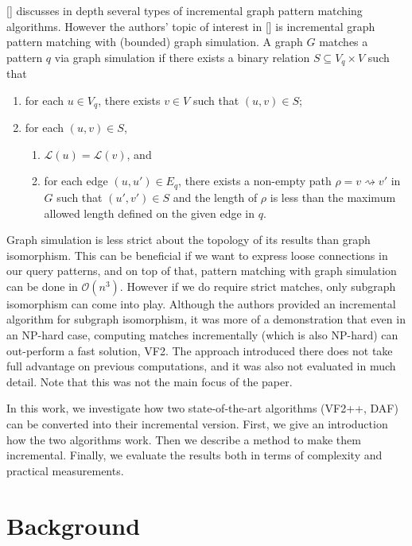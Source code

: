 [] 
discusses in depth several types of incremental graph pattern matching algorithms.
However the authors' topic of interest in [] is incremental graph pattern matching
with (bounded) graph simulation. A graph \(G\) matches a pattern \(q\) via graph 
simulation if there exists a binary relation \(S \subseteq V_q \times V\) such that 
\begin{enumerate}
    \item for each \(u \in V_q\), there exists \(v \in V\) such that \((u, v) \in S\);
    \item for each \((u, v) \in S\), 
        \begin{enumerate}
            \item \(\mathcal{L}(u) = \mathcal{L}(v)\), and
            \item for each edge \((u, u') \in E_q\), there exists a non-empty path \(\rho = v \rightsquigarrow v'\) in \(G\) such that \((u', v') \in S\) and the length of \(\rho\) is less than the maximum allowed length defined on the given edge in \(q\).
        \end{enumerate}
\end{enumerate}
Graph simulation is less strict about the topology of its results than graph
isomorphism. This can be beneficial if we want to express loose connections in
our query patterns, and on top of that, pattern matching with graph simulation
can be done in \(\mathcal{O}(n^3)\). However if we do require strict matches,
only subgraph isomorphism can come into play. Although the authors provided an
incremental algorithm for subgraph isomorphism, it was more of a demonstration
that even in an NP-hard case, computing matches incrementally (which is also
NP-hard) can out-perform a fast solution, VF2. The approach introduced there
does not take full advantage on previous computations, and it was also not 
evaluated in much detail. Note that this was not the main focus of the paper.

In this work, we investigate how two state-of-the-art algorithms (VF2++, DAF)
can be converted into their incremental version. First, we give an introduction
how the two algorithms work. Then we describe a method to make them incremental.
Finally, we evaluate the results both in terms of complexity and practical
measurements.

\section{Background}

